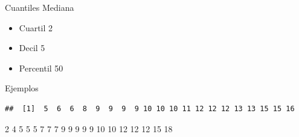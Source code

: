 \documentclass[
  11pt,
  ignorenonframetext,
]{beamer}
\providecommand{\tightlist}{%
  \setlength{\itemsep}{0pt}\setlength{\parskip}{0pt}}
\begin{document}
\begin{frame}{Cuantiles}
\protect\hypertarget{cuantiles-1}{}
Mediana

\begin{itemize}
\tightlist
\item
  Cuartil 2
\item
  Decil 5
\item
  Percentil 50
\end{itemize}
\end{frame}

\begin{frame}[fragile]{Ejemplos}
\protect\hypertarget{ejemplos}{}
\begin{verbatim}
##  [1]  5  6  6  8  9  9  9  9 10 10 10 11 12 12 12 13 13 15 15 16
\end{verbatim}

2 4 5 5 5 7 7 7 9 9 9 9 9 10 10 12 12 12 15 18
\end{frame}
\end{document}
